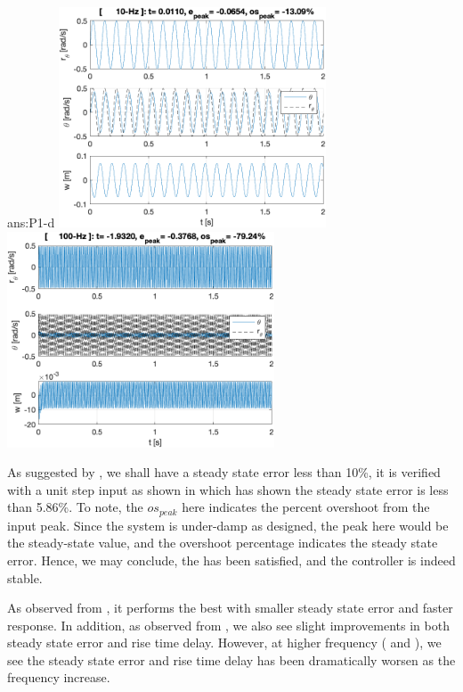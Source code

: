 \documentclass{tron}
\begin{document}
\begin{answer}{ans:P1-d}
{	}
	{	
		\centering\includegraphics[width=300px]{../matlab/output/q1/step_response_10-Hz}
	}
	{	
		\centering\includegraphics[width=300px]{../matlab/output/q1/step_response_100-Hz}
	}
	
	\begin{remark}{}
		As suggested by , we shall have a steady state error less than 10\%, it is verified with a unit step input as shown in  which has shown the steady state error is less than 5.86\%. To note, the $os_{peak}$ here indicates the percent overshoot from the input peak. Since the system is under-damp as designed, the peak here would be the steady-state value, and the overshoot percentage indicates the steady state error. Hence, we may conclude, the  has been satisfied, and the controller is indeed stable.
	\end{remark}
	
	\begin{remark}{}
		As observed from , it performs the best with smaller steady state error and faster response. In addition, as observed from , we also see slight improvements in both steady state error and rise time delay. However, at higher frequency ( and ), we see the steady state error and rise time delay has been dramatically worsen as the frequency increase. 
		

\end{remark}
\end{answer}
\end{document}
